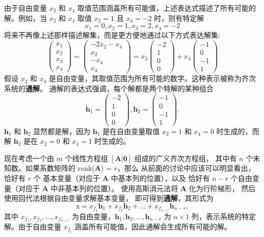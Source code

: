 由于自由变量 \(x_2\) 和 \(x_4\) 取值范围涵盖所有可能值，上述表达式描述了所有可能的解。例如，当 \(x_2\) 和 \(x_4\) 取值
\(x_2 = 1\) 且 \(x_4 = -2\) 时，则有特定解
\[
x_1 = 0, x_2 = 1, x_3 = 2, x_4 = -2
\]
将来不再像上述那样描述解集，而是更方便地通过以下方式表达解集: 
\[
\left(\begin{array}{c}
x_1\\
x_2\\
x_3\\
x_4
\end{array}\right)=
\left(\begin{array}{c}
-2x_2 - x_4\\
x_2\\
-x_4\\
x_4
\end{array}\right)=
x_2\left(\begin{array}{c}
-2\\
1\\
0\\
0
\end{array}\right)+
x_4\left(\begin{array}{c}
-1\\
0\\
-1\\
1
\end{array}\right)
\]
假设 \(x_2\) 和 \(x_4\) 是自由变量，其取值范围为所有可能的数字。这种表示被称为齐次系统的\textbf{通解}。
通解的表达式强调，每个解都是两个特解的某种组合
\[
\mathbf{h}_1 = 
\left(\begin{array}{c}
-2\\
1\\
0\\
0
\end{array}\right),  
\mathbf{h}_2 =
\left(\begin{array}{c}
-1\\
0\\
-1\\
1
\end{array}\right).
\]
\(\mathbf{h}_1\) 和 \(\mathbf{h}_2\) 显然都是解，因为 \(\mathbf{h}_1\) 是在自由变量取值 \(x_2 = 1\) 和 \(x_4 = 0\) 时生成的，而
解 \(\mathbf{h}_2\) 是在 \(x_2 = 0\) 和 \(x_4 = 1\) 时生成的。

现在考虑一个由 \(m\) 个线性方程组 \([\mathbf{A|0}]\) 组成的广义齐次方程组，
其中有 \(n\) 个未知数。如果系数矩阵的 rank(\(\mathbf{A}\)) = \(r\)，那么
从前面的讨论中应该可以明显看出，恰好有 \(r\) 个
基本变量（对应于 \(\mathbf{A}\) 中基本列的位置），以及
恰好有 \(n - r\) 个自由变量（对应于 \(\mathbf{A}\) 中非基本列的位置）。
使用高斯消元法将 \(\mathbf{A}\) 化为行阶梯形，
然后使用回代法根据自由变量求解基本变量，
即可得到\textbf{通解}，其形式为
\[
\mathrm{x} = x_{f_1}\mathbf{h}_1 + x_{f_2}\mathbf{h}_2 + ... + x_{f_{n-r}}\mathbf{h}_{n-r},
\]
其中 \(x_{f_1}, x_{f_2}, ..., x_{f_{n-r}}\) 为自由变量，\(\mathbf{h}_1, \mathbf{h}_2, ..., \mathbf{h}_{n-r}\) 为
\(n \times 1\) 列，表示系统的特定解。由于自由变量 \(x_{f_i}\) 涵盖所有可能值，因此通解会生成所有可能的解。

